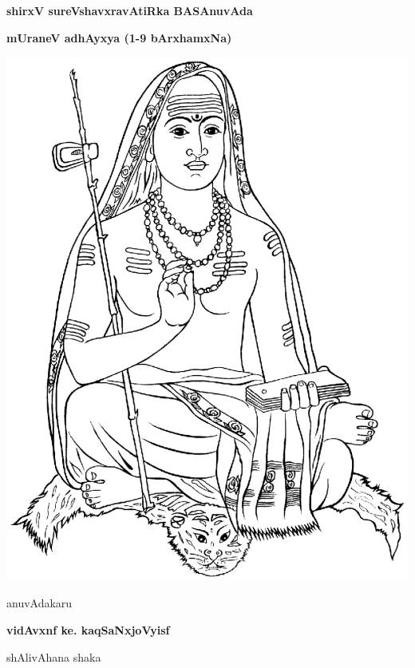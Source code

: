 \thispagestyle{empty}
\begin{center}
{\Huge\bfseries shirxV sureVshavxravAtiRka BASAnuvAda}
\bigskip

{\Large\bfseries mUraneV adhAyxya (1-9 bArxhamxNa)}
\bigskip

\vfill

\includegraphics[scale=0.7]{figures/shankaracharya.eps}

\vfill

anuvAdakaru
\smallskip

{\large\bfseries vidAvxnf ke. kaqSaNxjoVyisf}

\smallskip
shAlivAhana shaka

\end{center}
